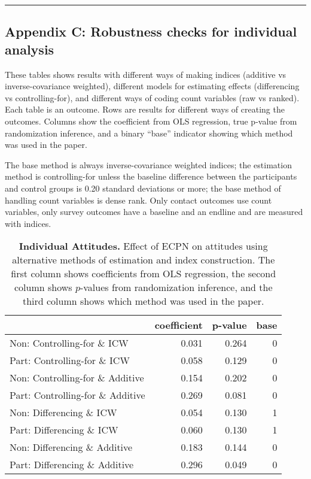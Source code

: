 \documentclass[
]{article}
\begin{document}
\begin{center}\rule{0.5\linewidth}{0.5pt}\end{center}

\hypertarget{appendix-c-robustness-checks-for-individual-analysis}{%
\subsection{Appendix C: Robustness checks for individual
analysis}\label{appendix-c-robustness-checks-for-individual-analysis}}

These tables shows results with different ways of making indices
(additive vs inverse-covariance weighted), different models for
estimating effects (differencing vs controlling-for), and different ways
of coding count variables (raw vs ranked). Each table is an outcome.
Rows are results for different ways of creating the outcomes. Columns
show the coefficient from OLS regression, true p-value from
randomization inference, and a binary ``base'' indicator showing which
method was used in the paper.

The base method is always inverse-covariance weighted indices; the
estimation method is controlling-for unless the baseline difference
between the participants and control groups is 0.20 standard deviations
or more; the base method of handling count variables is dense rank. Only
contact outcomes use count variables, only survey outcomes have a
baseline and an endline and are measured with indices.

\begin{table}[H]
\begin{center}
\label{tab:attitude_tab_ind}
\caption{\textbf{Individual Attitudes.} Effect of ECPN on attitudes using alternative methods of estimation and index construction. The first column shows coefficients from OLS regression, the second column shows $p$-values from randomization inference, and the third column shows which method was used in the paper.}
\smallskip

\begin{tabular}{l|r|r|r}
\hline
  & coefficient & p-value & base\\
\hline
Non: Controlling-for \& ICW & 0.031 & 0.264 & 0\\
\hline
Part: Controlling-for \& ICW & 0.058 & 0.129 & 0\\
\hline
Non: Controlling-for \& Additive & 0.154 & 0.202 & 0\\
\hline
Part: Controlling-for \& Additive & 0.269 & 0.081 & 0\\
\hline
Non: Differencing \& ICW & 0.054 & 0.130 & 1\\
\hline
Part: Differencing \& ICW & 0.060 & 0.130 & 1\\
\hline
Non: Differencing \& Additive & 0.183 & 0.144 & 0\\
\hline
Part: Differencing \& Additive & 0.296 & 0.049 & 0\\
\hline
\end{tabular}


\end{center}
\end{table}
\end{document}
